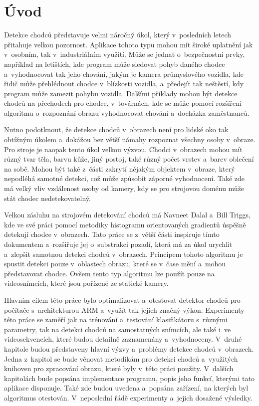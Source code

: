 \section{Úvod}
Detekce chodců představuje velmi náročný úkol, který v~posledních letech přitahuje velkou pozornost. 
Aplikace tohoto typu mohou mít široké uplatnění jak v~osobním, tak v~industriálním využití. Může se jednat o~bezpečnostní prvky, například na letištích, kde program může sledovat pohyb daného chodce a~vyhodnocovat tak jeho chování, jakým je kamera průmyslového vozidla, kde řidič může přehlédnout chodce v~blízkosti vozidla, a~předejít tak neštěstí, kdy program může zamezit pohybu vozidla. Dalšími příklady mohou být detekce chodců na přechodech pro chodce, v~továrnách, kde se může pomocí rozšíření algoritmu o~rozpoznání obrazu vyhodnocovat chování a~docházka zaměstnanců. 

Nutno podotknout, že detekce chodců v~obrazech není pro lidské oko tak obtížným úkolem a~dokážou bez větší námahy rozpoznat všechny osoby v~obraze. Pro stroje je naopak tento úkol velkou výzvou. Chodci v~obrazech mohou mít různý tvar těla, barvu kůže, jiný postoj, také různý počet vrstev a~barev oblečení na sobě. Mohou být také z~části zakrytí nějakým objektem v~obraze, který nepodléhá samotné detekci, což může způsobit záporné vyhodnocení. Také zde má velký vliv vzdálenost osoby od kamery, kdy se pro strojovou doménu může stát chodec nedetekovatelný. 

Velkou zásluhu na strojovém detekování chodců má Navneet Dalal a~Bill Triggs, kde ve své práci \cite{hog:dalal} pomocí metodiky histogramu orientovaných gradientů úspěšně detekují chodce v~obrazech. Tato práce se z~větší části inspiruje tímto dokumentem a~rozšiřuje jej o~substrakci pozadí, která má za úkol urychlit a~zlepšit samotnou detekci chodců v~obrazech. Principem tohoto algoritmu je spustit detekci pouze v~oblastech obrazu, které se v~čase mění a~mohou představovat chodce. Ovšem tento typ algoritmu lze použít pouze na videosnímcích, které jsou pořízené ze statické kamery.

Hlavním cílem této práce bylo optimalizovat a~otestovat detektor chodců pro počítače s~architekturou ARM a~využít tak jejich značný výkon. 
Experimenty této práce se zaměří jak na trénování a~testování klasifikátoru s~různými parametry, tak na detekci chodců na samostatných snímcích, ale také i~ve videosekvencích, které budou detailně zaznamenány a~vyhodnoceny. 
V~druhé kapitole budou představeny hlavní výzvy a~problémy detekce chodců v~obrazech.
Jedna z~kapitol se bude věnovat metodikám pro detekci chodců a~využitých knihoven pro zpracování obrazu, které byly v~této práci použity.
V~dalších kapitolách bude popsána implementace programu, popis jeho funkcí, kterými tato aplikace disponuje. Také zde budou uvedena a~popsána zařízení, na kterých byl algoritmus otestován. V~neposlední řádě experimenty a~jejich dosažené výsledky.